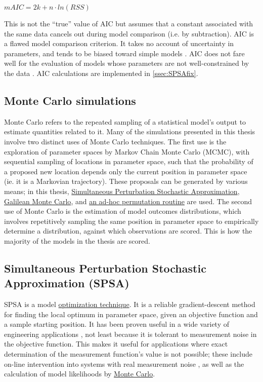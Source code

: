 $mAIC = 2k + n \cdot ln(RSS)$ 
\cite{Burnham2002}

This is not the ``true'' value of AIC but assumes that a constant associated with the same data cancels out during model comparison (i.e. by subtraction). AIC is a flawed model comparison criterion. It takes no account of uncertainty in parameters, and tends to be biased toward simple models \cite[p.33]{Bishop2006}. AIC does not fare well for the evaluation of models whose parameters are not well-constrained by the data \cite[p.217]{Bishop2006}. AIC calculations are implemented in \autoref{ssec:SPSAfix}.

\subsection{Monte Carlo simulations}
\label{ssec:MonteCarlo}
Monte Carlo refers to the repeated sampling of a statistical model's output to estimate quantities related to it. Many of the simulations presented in this thesis involve two distinct uses of Monte Carlo techniques. The first use is the exploration of parameter spaces by Markov Chain Monte Carlo (MCMC), with sequential sampling of locations in parameter space, such that the probability of a proposed new location depends only the current position in parameter space (ie. it is a Markovian trajectory). These proposals can be generated by various means; in this thesis, \hyperref[ssec:SPSA]{Simultaneous Perturbation Stochastic Approximation}, \hyperref[ssec:GMC]{Galilean Monte Carlo}, and \hyperref[ssec:adhoc]{an ad-hoc permutation routine} are used. The second use of Monte Carlo is the estimation of model outcomes distributions, which involves repetitively sampling the same position in parameter space to empirically determine a distribution, against which observations are scored. This is how the majority of the models in the thesis are scored. 

\subsection{Simultaneous Perturbation Stochastic Approximation (SPSA)}
\label{ssec:SPSA}
SPSA is a model \hyperref[ssec:MLE]{optimization technique}. It is a reliable gradient-descent method for finding the local optimum in parameter space, given an objective function and a sample starting position. It has been proven useful in a wide variety of engineering applications \cite{Kleinman1997,Zhou2008}, not least because it is tolerant to measurement noise in the objective function. This makes it useful for applications where exact determination of the measurement function's value is not possible; these include on-line intervention into systems with real measurement noise \cite{Zhou2008}, as well as the calculation of model likelihoods by \hyperref[ssec:MonteCarlo]{Monte Carlo}.

